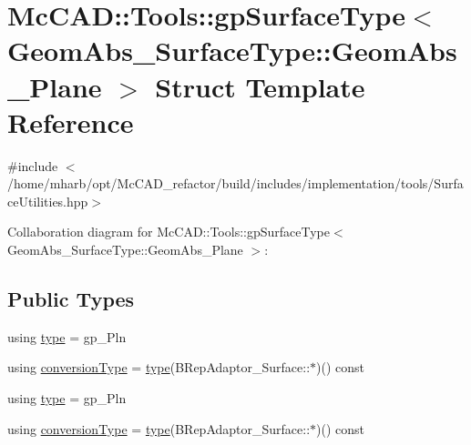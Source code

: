 \hypertarget{structMcCAD_1_1Tools_1_1gpSurfaceType_3_01GeomAbs__SurfaceType_1_1GeomAbs__Plane_01_4}{}\section{Mc\+C\+AD\+:\+:Tools\+:\+:gp\+Surface\+Type$<$ Geom\+Abs\+\_\+\+Surface\+Type\+:\+:Geom\+Abs\+\_\+\+Plane $>$ Struct Template Reference}
\label{structMcCAD_1_1Tools_1_1gpSurfaceType_3_01GeomAbs__SurfaceType_1_1GeomAbs__Plane_01_4}


{\ttfamily \#include $<$/home/mharb/opt/\+Mc\+C\+A\+D\+\_\+refactor/build/includes/implementation/tools/\+Surface\+Utilities.\+hpp$>$}



Collaboration diagram for Mc\+C\+AD\+:\+:Tools\+:\+:gp\+Surface\+Type$<$ Geom\+Abs\+\_\+\+Surface\+Type\+:\+:Geom\+Abs\+\_\+\+Plane $>$\+:
\subsection*{Public Types}
\begin{DoxyCompactItemize}
\item 
using \hyperlink{structMcCAD_1_1Tools_1_1gpSurfaceType_3_01GeomAbs__SurfaceType_1_1GeomAbs__Plane_01_4_ab24fc89b7c5c8901221bb746493cf7f0}{type} = gp\+\_\+\+Pln
\item 
using \hyperlink{structMcCAD_1_1Tools_1_1gpSurfaceType_3_01GeomAbs__SurfaceType_1_1GeomAbs__Plane_01_4_af051c9209de7043f45d15c7394d66710}{conversion\+Type} = \hyperlink{structMcCAD_1_1Tools_1_1gpSurfaceType_3_01GeomAbs__SurfaceType_1_1GeomAbs__Plane_01_4_ab24fc89b7c5c8901221bb746493cf7f0}{type}(B\+Rep\+Adaptor\+\_\+\+Surface\+::$\ast$)() const
\item 
using \hyperlink{structMcCAD_1_1Tools_1_1gpSurfaceType_3_01GeomAbs__SurfaceType_1_1GeomAbs__Plane_01_4_ab24fc89b7c5c8901221bb746493cf7f0}{type} = gp\+\_\+\+Pln
\item 
using \hyperlink{structMcCAD_1_1Tools_1_1gpSurfaceType_3_01GeomAbs__SurfaceType_1_1GeomAbs__Plane_01_4_af051c9209de7043f45d15c7394d66710}{conversion\+Type} = \hyperlink{structMcCAD_1_1Tools_1_1gpSurfaceType_3_01GeomAbs__SurfaceType_1_1GeomAbs__Plane_01_4_ab24fc89b7c5c8901221bb746493cf7f0}{type}(B\+Rep\+Adaptor\+\_\+\+Surface\+::$\ast$)() const
\end{DoxyCompactItemize}

